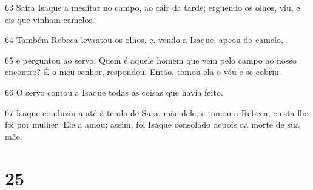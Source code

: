\par 63 Saíra Isaque a meditar no campo, ao cair da tarde; erguendo os olhos, viu, e eis que vinham camelos.
\par 64 Também Rebeca levantou os olhos, e, vendo a Isaque, apeou do camelo,
\par 65 e perguntou ao servo: Quem é aquele homem que vem pelo campo ao nosso encontro? É o meu senhor, respondeu. Então, tomou ela o véu e se cobriu.
\par 66 O servo contou a Isaque todas as coisas que havia feito.
\par 67 Isaque conduziu-a até à tenda de Sara, mãe dele, e tomou a Rebeca, e esta lhe foi por mulher. Ele a amou; assim, foi Isaque consolado depois da morte de sua mãe.

\chapter{25}

